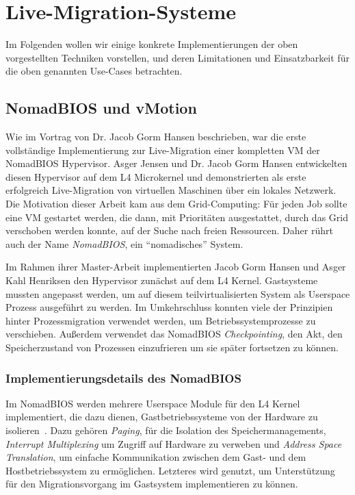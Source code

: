 \section{Live-Migration-Systeme}
\label{sec:live-migr-syst}
Im Folgenden wollen wir einige konkrete Implementierungen der oben
vorgestellten Techniken vorstellen, und deren Limitationen und
Einsatzbarkeit für die oben genannten Use-Cases betrachten.

\subsection{NomadBIOS und vMotion}
\label{sec:nomadbios--vmware}
Wie im Vortrag von Dr. Jacob Gorm Hansen beschrieben, war die erste
vollständige Implementierung zur Live-Migration einer kompletten \ac{VM}
der NomadBIOS Hypervisor. Asger Jensen und Dr. Jacob Gorm Hansen
entwickelten diesen Hypervisor auf dem L4 Microkernel und
demonstrierten als erste erfolgreich Live-Migration von virtuellen
Maschinen über ein lokales Netzwerk. Die Motivation dieser Arbeit kam
aus dem Grid-Computing: Für jeden Job sollte eine \ac{VM} gestartet werden,
die dann, mit Prioritäten ausgestattet, durch das Grid verschoben
werden konnte, auf der Suche nach freien Ressourcen. Daher rührt auch
der Name \emph{NomadBIOS}, ein "`nomadisches"' System.

Im Rahmen ihrer Master-Arbeit implementierten Jacob Gorm Hansen und
Asger Kahl Henriksen den Hypervisor zunächst auf dem L4
Kernel. Gastsysteme mussten angepasst werden, um auf diesem
teilvirtualisierten System als Userspace Prozess ausgeführt zu
werden. Im Umkehrschluss konnten viele der Prinzipien hinter
Prozessmigration verwendet werden, um Betriebssystemprozesse zu
verschieben. Außerdem verwendet das NomadBIOS \emph{Checkpointing},
den Akt, den Speicherzustand von Prozessen einzufrieren um sie später
fortsetzen zu können.

\subsubsection{Implementierungsdetails des NomadBIOS}
\label{sec:impl-des-nomadb}
Im NomadBIOS werden mehrere Userspace Module für den L4 Kernel
implementiert, die dazu dienen, Gastbetriebssysteme von der Hardware
zu isolieren~\cite{hansen2002nomadic}. Dazu gehören \emph{Paging}, für
die Isolation des Speichermanagements, \emph{Interrupt Multiplexing}
um Zugriff auf Hardware zu verweben und \emph{Address Space
  Translation}, um einfache Kommunikation zwischen dem Gast- und dem
Hostbetriebssystem zu ermöglichen. Letzteres wird genutzt, um
Unterstützung für den Migrationsvorgang im Gastsystem implementieren
zu können.

